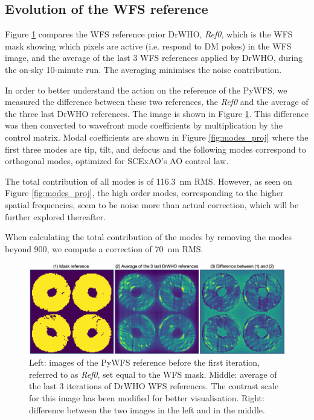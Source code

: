 \documentclass[twocolumn]{aa}
\begin{document}
\subsection{Evolution of the WFS reference}

Figure \ref{fig:reference_diff} compares the WFS reference prior DrWHO, \textit{Ref0}, which is the WFS mask showing which pixels are active (i.e. respond to DM pokes) in the WFS image, and the average of the last 3 WFS references applied by DrWHO, during the on-sky 10-minute run. The averaging minimises the noise contribution. 

In order to better understand the action on the reference of the PyWFS, we measured the difference between these two references, the \textit{Ref0} and the average of the three last DrWHO references. The image is shown in Figure \ref{fig:reference_diff}. This difference was then converted to wavefront mode coefficients by multiplication by the control matrix. Modal coefficients are shown in Figure \ref{fig:modes_proj} where the first three modes are tip, tilt, and defocus and the following modes correspond to orthogonal modes, optimized for SCExAO's AO control law.


The total contribution of all modes is of 116.3~nm RMS. However, as seen on Figure \ref{fig:modes_proj}, the high order modes, corresponding to the higher spatial frequencies, seem to be noise more than actual correction, which will be further explored thereafter. 

When calculating the total contribution of the modes by removing the modes beyond 900, we compute a correction of 70~nm RMS.

\begin{figure}[t]
\centering
\includegraphics[width=.48\textwidth]{fig/reference_diff.png}
\caption{Left: images of the PyWFS reference before the first iteration, referred to as \textit{Ref0}, set equal to the WFS mask. Middle: average of the last 3 iterations of DrWHO WFS references. The contrast scale for this image has been modified for better visualisation. Right: difference between the two images in the left and in the middle.}
\label{fig:reference_diff}
\end{figure}
\end{document}
